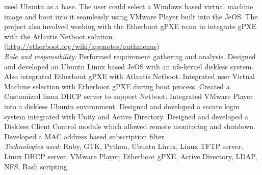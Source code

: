 \documentclass{scrartcl}
\begin{document}
\begin{cv}{
\href{http://www.develmj.com}{}
}
{\begin{itemize}
{used Ubuntu as a base. The user could select a Windows based virtual
machine image and boot into it seamlessly using VMware Player built into the
JeOS. The project also involved working with the Etherboot gPXE team to
integrate gPXE with the Atlantis Netboot solution.
\\(\url{http://etherboot.org/wiki/appnotes/authmenus})}\\
  \vspace{0.5em}
  \textsl{Role and responsibility:} {\scriptsize Performed requirement gathering
  and analysis. Designed and developed an Ubuntu Linux based
  JeOS with an nfs-kernel diskless system. Also integrated Etherboot
  gPXE with Atlantis Netboot. Integrated user Virtual Machine selection with Etherboot
  gPXE during boot process. Created a Customized linux DHCP server
  to support Netboot. Integrated VMware Player into a diskless Ubuntu
  environment. Designed and developed a secure login system integrated
  with Unity and Active Directory. Designed and developed a Diskless
  Client Control module which allowed remote monitoring and
  shutdown. Developed a MAC address based subscription filter.}\\
\vspace{0.5em}
\textsl{Technologies used:} {\scriptsize Ruby, GTK, Python, Ubuntu Linux, Linux TFTP server,
  Linux DHCP server, VMware Player, Etherboot gPXE, Active Directory, LDAP,
  NFS, Bash scripting}
\end{itemize}
}

\vspace{0.75em}


\end{cv}
\end{document}
